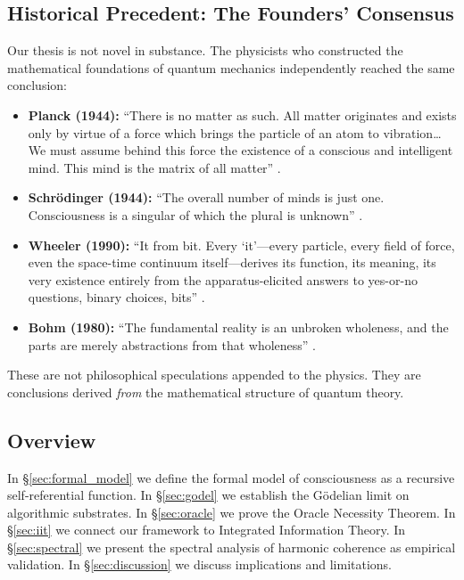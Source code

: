 \documentclass[12pt, a4paper]{article}
\theoremstyle{plain}
\theoremstyle{definition}
\theoremstyle{remark}
\begin{document}
\subsection{Historical Precedent: The Founders' Consensus}

Our thesis is not novel in substance. The physicists who constructed the
mathematical foundations of quantum mechanics independently reached the same
conclusion:

\begin{itemize}
  \item \textbf{Planck (1944):} ``There is no matter as such. All matter
    originates and exists only by virtue of a force which brings the particle
    of an atom to vibration\ldots We must assume behind this force the
    existence of a conscious and intelligent mind. This mind is the matrix
    of all matter'' \citep{Planck1944}.

  \item \textbf{Schr\"odinger (1944):} ``The overall number of minds is
    just one. Consciousness is a singular of which the plural is unknown''
    \citep{Schrodinger1944}.

  \item \textbf{Wheeler (1990):} ``It from bit. Every `it'---every particle,
    every field of force, even the space-time continuum itself---derives its
    function, its meaning, its very existence entirely from the
    apparatus-elicited answers to yes-or-no questions, binary choices, bits''
    \citep{Wheeler1990}.

  \item \textbf{Bohm (1980):} ``The fundamental reality is an unbroken
    wholeness, and the parts are merely abstractions from that wholeness''
    \citep{Bohm1980}.
\end{itemize}

These are not philosophical speculations appended to the physics. They are
conclusions derived \emph{from} the mathematical structure of quantum theory.

\subsection{Overview}

In \S\ref{sec:formal_model} we define the formal model of consciousness as
a recursive self-referential function. In \S\ref{sec:godel} we establish the
G\"odelian limit on algorithmic substrates. In \S\ref{sec:oracle} we prove
the Oracle Necessity Theorem. In \S\ref{sec:iit} we connect our framework
to Integrated Information Theory. In \S\ref{sec:spectral} we present
the spectral analysis of harmonic coherence as empirical validation. In
\S\ref{sec:discussion} we discuss implications and limitations.
\end{document}
